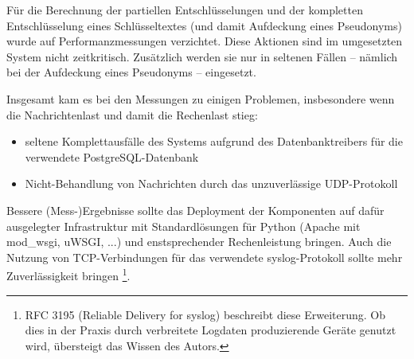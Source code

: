 Für die Berechnung der partiellen Entschlüsselungen und der kompletten Entschlüsselung eines Schlüsseltextes (und damit Aufdeckung eines Pseudonyms) wurde auf Performanzmessungen verzichtet. Diese Aktionen sind im umgesetzten System nicht zeitkritisch. Zusätzlich werden sie nur in seltenen Fällen -- nämlich bei der Aufdeckung eines Pseudonyms -- eingesetzt.

Insgesamt kam es bei den Messungen zu einigen Problemen, insbesondere wenn die Nachrichtenlast und damit die Rechenlast stieg:
\begin{itemize}
\item seltene Komplettausfälle des Systems aufgrund des Datenbanktreibers für die verwendete PostgreSQL-Datenbank
\item Nicht-Behandlung von Nachrichten durch das unzuverlässige UDP-Protokoll
\end{itemize}
Bessere (Mess-)Ergebnisse sollte das Deployment der Komponenten auf dafür ausgelegter Infrastruktur mit Standardlösungen für Python (Apache mit mod\_wsgi, uWSGI, ...) und enstsprechender Rechenleistung bringen. Auch die Nutzung von TCP-Verbindungen für das verwendete syslog-Protokoll sollte mehr Zuverlässigkeit bringen \footnote{
  RFC 3195 (Reliable Delivery for syslog) beschreibt diese Erweiterung. Ob dies in der Praxis durch verbreitete Logdaten produzierende Geräte genutzt wird, übersteigt das Wissen des Autors.
}. 
